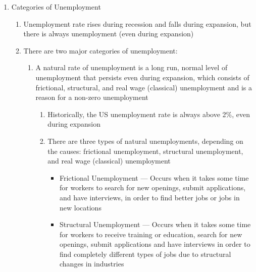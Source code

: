 \documentclass[12pt]{article}
\begin{document}
\begin{enumerate}
\begin{enumerate}
\begin{enumerate}
            \end{enumerate}

        \end{enumerate}

      \item Categories of Unemployment

        \begin{enumerate}

          \item Unemployment rate rises during recession and falls during expansion, but there is always unemployment (even during expansion)

          \item There are two major categories of unemployment:

            \begin{enumerate}

              \item A natural rate of unemployment is a long run, normal level of unemployment that persists even during expansion, which consists of frictional, structural, and real wage (classical) unemployment and is a reason for a non-zero unemployment

                \begin{enumerate}

                  \item Historically, the US unemployment rate is always above 2\%, even during expansion

                  \item There are three types of natural unemployments, depending on the causes: frictional unemployment, structural unemployment, and real wage (classical) unemployment

                    \begin{itemize}

                      \item Frictional Unemployment — Occurs when it takes some time for workers to search for new openings, submit applications, and have interviews, in order to find better jobs or jobs in new locations

                      \item Structural Unemployment — Occurs when it takes some time for workers to receive training or education, search for new openings, submit applications and have interviews in order to find completely different types of jobs due to structural changes in industries


\end{itemize}
\end{enumerate}
\end{enumerate}
\end{enumerate}
\end{enumerate}
\end{document}
